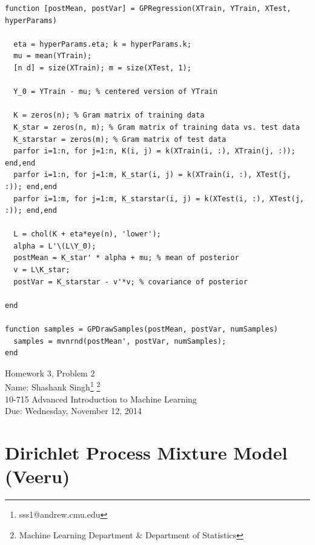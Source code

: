 \documentclass[11pt]{article}
\makeatletter
\newcommand{\myname}{Shashank Singh\footnote{sss1@andrew.cmu.edu}
        \footnote{Machine Learning Department \& Department of Statistics}}
\newcommand{\myclass}{10-715 Advanced Introduction to Machine Learning}
\newcommand{\myhwnum}{3}
\newcommand{\duedate}{Wednesday, November 12, 2014}
\newcommand{\K}{\mathbb{K}} %
\newcommand{\Y}{\mathcal{Y}}
\makeatother
\begin{document}
\begin{verbatim}
function [postMean, postVar] = GPRegression(XTrain, YTrain, XTest, hyperParams)

  eta = hyperParams.eta; k = hyperParams.k;
  mu = mean(YTrain);
  [n d] = size(XTrain); m = size(XTest, 1);

  Y_0 = YTrain - mu; % centered version of YTrain

  K = zeros(n); % Gram matrix of training data
  K_star = zeros(n, m); % Gram matrix of training data vs. test data
  K_starstar = zeros(m); % Gram matrix of test data
  parfor i=1:n, for j=1:n, K(i, j) = k(XTrain(i, :), XTrain(j, :)); end,end
  parfor i=1:n, for j=1:m, K_star(i, j) = k(XTrain(i, :), XTest(j, :)); end,end
  parfor i=1:m, for j=1:m, K_starstar(i, j) = k(XTest(i, :), XTest(j, :)); end,end

  L = chol(K + eta*eye(n), 'lower');
  alpha = L'\(L\Y_0);
  postMean = K_star' * alpha + mu; % mean of posterior
  v = L\K_star;
  postVar = K_starstar - v'*v; % covariance of posterior

end

function samples = GPDrawSamples(postMean, postVar, numSamples)
  samples = mvnrnd(postMean', postVar, numSamples);
end
\end{verbatim}

\newpage
{\Large Homework \myhwnum, Problem 2} \\
Name: \myname \\
\myclass \\
Due: \duedate

\section{Dirichlet Process Mixture Model (Veeru)}
\end{document}
